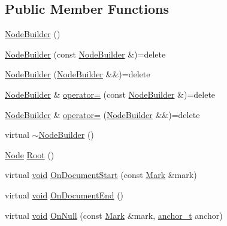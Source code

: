 \subsection*{Public Member Functions}
\begin{DoxyCompactItemize}
\item 
\mbox{\hyperlink{class_y_a_m_l_1_1_node_builder_aa49e445eb75f93a714e6cb5682313daa}{Node\+Builder}} ()
\item 
\mbox{\hyperlink{class_y_a_m_l_1_1_node_builder_a6d70411ab26f00493619515f54157dd2}{Node\+Builder}} (const \mbox{\hyperlink{class_y_a_m_l_1_1_node_builder}{Node\+Builder}} \&)=delete
\item 
\mbox{\hyperlink{class_y_a_m_l_1_1_node_builder_ae2ba6bb03a1f2e370021c4fc9161a6d6}{Node\+Builder}} (\mbox{\hyperlink{class_y_a_m_l_1_1_node_builder}{Node\+Builder}} \&\&)=delete
\item 
\mbox{\hyperlink{class_y_a_m_l_1_1_node_builder}{Node\+Builder}} \& \mbox{\hyperlink{class_y_a_m_l_1_1_node_builder_a56c9a3ed0f3e0fd3049e9b124a2185cb}{operator=}} (const \mbox{\hyperlink{class_y_a_m_l_1_1_node_builder}{Node\+Builder}} \&)=delete
\item 
\mbox{\hyperlink{class_y_a_m_l_1_1_node_builder}{Node\+Builder}} \& \mbox{\hyperlink{class_y_a_m_l_1_1_node_builder_aeebc8aa910d1da025cc50118803ea406}{operator=}} (\mbox{\hyperlink{class_y_a_m_l_1_1_node_builder}{Node\+Builder}} \&\&)=delete
\item 
virtual \mbox{\hyperlink{class_y_a_m_l_1_1_node_builder_a9403311efd5ad020b1c486a73764a2cb}{$\sim$\+Node\+Builder}} ()
\item 
\mbox{\hyperlink{class_y_a_m_l_1_1_node}{Node}} \mbox{\hyperlink{class_y_a_m_l_1_1_node_builder_a04a3a526a145110393efac4905714bb1}{Root}} ()
\item 
virtual \mbox{\hyperlink{glad_8h_a950fc91edb4504f62f1c577bf4727c29}{void}} \mbox{\hyperlink{class_y_a_m_l_1_1_node_builder_a5c14e6ce94790880411dc26f60fc25c5}{On\+Document\+Start}} (const \mbox{\hyperlink{struct_y_a_m_l_1_1_mark}{Mark}} \&mark)
\item 
virtual \mbox{\hyperlink{glad_8h_a950fc91edb4504f62f1c577bf4727c29}{void}} \mbox{\hyperlink{class_y_a_m_l_1_1_node_builder_ae97951424f9c611ea4770dc9fb18f41b}{On\+Document\+End}} ()
\item 
virtual \mbox{\hyperlink{glad_8h_a950fc91edb4504f62f1c577bf4727c29}{void}} \mbox{\hyperlink{class_y_a_m_l_1_1_node_builder_a7fb5d6a9d2e1c1688bf0b8e1881dc5bf}{On\+Null}} (const \mbox{\hyperlink{struct_y_a_m_l_1_1_mark}{Mark}} \&mark, \mbox{\hyperlink{namespace_y_a_m_l_abeff1798814ae3402fc5665fdcad1de6}{anchor\+\_\+t}} anchor)

\end{DoxyCompactItemize}
